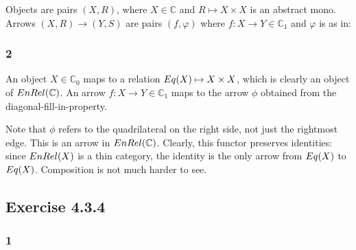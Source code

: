 \documentclass{article}
\begin{document}
Objects are pairs $(X,R)$, where $X \in \mathbb C$ and $R \mapsto X \times X$ is an abstract mono.
Arrows $(X,R) \to (Y,S)$ are pairs $(f, \varphi)$ where $f : X \to Y \in \mathbb C_1$ and $\varphi$ is as in:
\begin{center}
\end{center} 

\subsubsection*{2}

An object $X \in \mathbb C_0$ maps to a relation $\mit{Eq}(X) \mapsto X \times X$, which is clearly an object
of $\mit{EnRel}(\mathbb C)$. An arrow $f : X \to Y \in \mathbb C_1$ maps to the arrow $\phi$ obtained from the diagonal-fill-in-property. 

\begin{center}
\end{center} 

Note that $\phi$ refers to the quadrilateral on the right side, not just the rightmost edge. This is an arrow in $\mit{EnRel}(\mathbb C)$. Clearly, this functor preserves identities: since $\mit{EnRel}(X)$ is a thin category, the identity is the only
arrow from $\mit{Eq}(X)$ to $\mit{Eq}(X)$. Composition is not much harder to see.

\subsection*{Exercise 4.3.4}

\subsubsection*{1}
\end{document}
